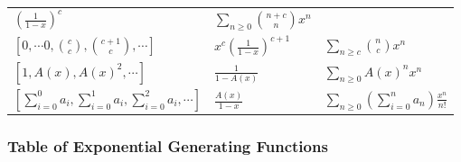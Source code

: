 \begin{longtable}[]{@{}lll@{}}
\begin{minipage}[t]{0.30\columnwidth}
\(\left( \frac 1 {1-x} \right)^c\)\strut
\end{minipage} & \begin{minipage}[t]{0.30\columnwidth}\raggedright
\(\displaystyle\sum_{n \geq 0}{n+c \choose n} x^n\)\strut
\end{minipage}\tabularnewline
\begin{minipage}[t]{0.30\columnwidth}\raggedright
\([0,\cdots 0, {c \choose c}, {c+1 \choose c}, \cdots]\)\strut
\end{minipage} & \begin{minipage}[t]{0.30\columnwidth}\raggedright
\(x^c \left(\frac{1}{1-x}\right)^{c+1}\)\strut
\end{minipage} & \begin{minipage}[t]{0.30\columnwidth}\raggedright
\(\displaystyle\sum_{n\geq c}{n \choose c}x^n\)\strut
\end{minipage}\tabularnewline
\begin{minipage}[t]{0.30\columnwidth}\raggedright
\([1, A(x), A(x)^2, \cdots ]\)\strut
\end{minipage} & \begin{minipage}[t]{0.30\columnwidth}\raggedright
\(\frac {1}{1-A(x)}\)\strut
\end{minipage} & \begin{minipage}[t]{0.30\columnwidth}\raggedright
\(\displaystyle\sum_{n\geq 0} A(x)^n {x^n}\)\strut
\end{minipage}\tabularnewline
\begin{minipage}[t]{0.30\columnwidth}\raggedright
\([\sum_{i=0}^0 a_i, \sum_{i=0}^1 a_i, \sum_{i=0}^2 a_i, \cdots ]\)\strut
\end{minipage} & \begin{minipage}[t]{0.30\columnwidth}\raggedright
\(\frac{A(x)}{1-x}\)\strut
\end{minipage} & \begin{minipage}[t]{0.30\columnwidth}\raggedright
\(\displaystyle\sum_{n\geq 0} \left(\sum_{i=0}^n a_n\right) \frac{x^n}{n!}\)\strut
\end{minipage}\tabularnewline
\bottomrule
\end{longtable}

\newpage

\hypertarget{table-of-exponential-generating-functions}{%
\subsubsection{Table of Exponential Generating
Functions}\label{table-of-exponential-generating-functions}}

